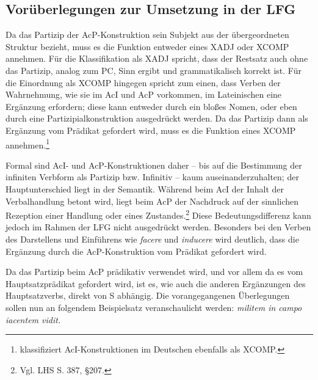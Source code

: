 \documentclass[12pt,a4paper]{article}
\begin{document}



\subsection{Vorüberlegungen zur Umsetzung in der LFG}
Da das Partizip der AcP-Konstruktion sein Subjekt aus der übergeordneten Struktur bezieht, muss es die Funktion entweder eines XADJ oder XCOMP annehmen. Für die Klassifikation als XADJ spricht, dass der Restsatz auch ohne das Partizip, analog zum PC, Sinn ergibt und grammatikalisch korrekt ist. Für die Einordnung als XCOMP hingegen spricht zum einen, dass Verben der Wahrnehmung, wie sie im AcI und AcP vorkommen, im Lateinischen eine Ergänzung erfordern; diese kann entweder durch ein bloßes Nomen, oder eben durch eine Partizipialkonstruktion ausgedrückt werden. Da das Partizip dann als Ergänzung vom Prädikat gefordert wird, muss es die Funktion eines XCOMP annehmen.\footnote{\cite[53]{Skript} klassifiziert AcI-Konstruktionen im Deutschen ebenfalls als XCOMP.}

Formal sind AcI- und AcP-Konstruktionen daher -- bis auf die Bestimmung der infiniten Verbform als Partizip bzw. Infinitiv -- kaum auseinanderzuhalten; der Hauptunterschied liegt in der Semantik. Während beim AcI der Inhalt der Verbalhandlung betont wird, liegt beim AcP der Nachdruck auf der sinnlichen Rezeption einer Handlung oder eines Zustandes.\footnote{Vgl. LHS S. 387, §207.} Diese Bedeutungsdifferenz kann jedoch im Rahmen der LFG nicht ausgedrückt werden. Besonders bei den Verben des Darstellens und Einführens wie \textit{facere} und \textit{inducere} wird deutlich, dass die Ergänzung durch die AcP-Konstruktion vom Prädikat gefordert wird.

Da das Partizip beim AcP prädikativ verwendet wird, und vor allem da es vom Hauptsatzprädikat gefordert wird, ist es, wie auch die anderen Ergänzungen des Hauptsatzverbs, direkt von S abhängig. Die vorangegangenen Überlegungen sollen nun an folgendem Beispielsatz veranschaulicht werden: \textit{militem in campo iacentem vidit.}
\end{document}
